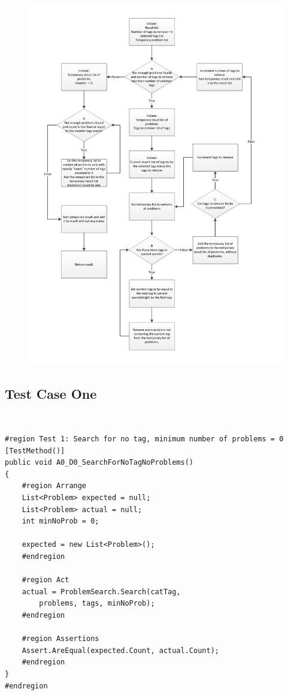 \label{sec:unit_problem_search}
\begin{figure}[p]
	\centering
		\includegraphics[width=1.25\textwidth]{input/testing/problem_search.pdf}
	\label{fig:problem_search_flow}
\end{figure}


\subsection{Test Case One}\
\begin{lstlisting}[style=sourceCode, caption=\myCaption{The test case for no run of any loops}, label=src:noLoops,float=htb]
#region Test 1: Search for no tag, minimum number of problems = 0
[TestMethod()]
public void A0_D0_SearchForNoTagNoProblems()
{
	#region Arrange
	List<Problem> expected = null;
	List<Problem> actual = null;
	int minNoProb = 0;

	expected = new List<Problem>();
	#endregion

	#region Act
	actual = ProblemSearch.Search(catTag,
		problems, tags, minNoProb);
	#endregion

	#region Assertions
	Assert.AreEqual(expected.Count, actual.Count);
	#endregion
}
#endregion
\end{lstlisting}

